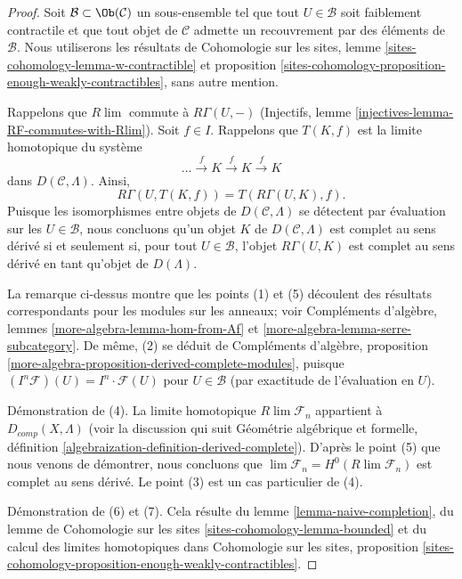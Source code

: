 \begin{proof}
Soit $\mathcal{B} \subset \Ob(\mathcal{C})$ un sous-ensemble tel que tout
$U \in \mathcal{B}$ soit faiblement contractile et que tout objet de $\mathcal{C}$
admette un recouvrement par des éléments de $\mathcal{B}$.
Nous utiliserons les résultats de Cohomologie sur les sites,
lemme \ref{sites-cohomology-lemma-w-contractible} et
proposition \ref{sites-cohomology-proposition-enough-weakly-contractibles},
sans autre mention.

\medskip\noindent
Rappelons que $R\lim$ commute à $R\Gamma(U, -)$
(Injectifs, lemme \ref{injectives-lemma-RF-commutes-with-Rlim}).
Soit $f \in I$. Rappelons que $T(K, f)$ est la limite homotopique
du système
$$
\ldots \xrightarrow{f} K \xrightarrow{f} K \xrightarrow{f} K
$$
dans $D(\mathcal{C}, \Lambda)$. Ainsi,
$$
R\Gamma(U, T(K, f)) = T(R\Gamma(U, K), f).
$$
Puisque les isomorphismes entre objets de
$D(\mathcal{C}, \Lambda)$ se détectent par évaluation sur les $U \in \mathcal{B}$,
nous concluons qu'un objet $K$ de $D(\mathcal{C}, \Lambda)$
est complet au sens dérivé si et seulement si, pour tout $U \in \mathcal{B}$,
l'objet $R\Gamma(U, K)$ est complet au sens dérivé en tant qu'objet de $D(\Lambda)$.

\medskip\noindent
La remarque ci-dessus montre que les points (1) et (5) découlent des résultats correspondants
pour les modules sur les anneaux; voir
Compléments d'algèbre, lemmes \ref{more-algebra-lemma-hom-from-Af} et
\ref{more-algebra-lemma-serre-subcategory}.
De même, (2) se déduit de
Compléments d'algèbre, proposition
\ref{more-algebra-proposition-derived-complete-modules},
puisque $(I^n\mathcal{F})(U) = I^n \cdot \mathcal{F}(U)$
pour $U \in \mathcal{B}$ (par exactitude de l'évaluation en $U$).

\medskip\noindent
Démonstration de (4). La limite homotopique $R\lim \mathcal{F}_n$ appartient à
$D_{comp}(X, \Lambda)$ (voir la discussion qui suit
Géométrie algébrique et formelle, définition
\ref{algebraization-definition-derived-complete}).
D'après le point (5) que nous venons de démontrer, nous concluons que
$\lim \mathcal{F}_n = H^0(R\lim \mathcal{F}_n)$
est complet au sens dérivé.
Le point (3) est un cas particulier de (4).

\medskip\noindent
Démonstration de (6) et (7). Cela résulte du
lemme \ref{lemma-naive-completion},
du
lemme de Cohomologie sur les sites \ref{sites-cohomology-lemma-bounded}
et du calcul des limites homotopiques dans Cohomologie sur les sites,
proposition \ref{sites-cohomology-proposition-enough-weakly-contractibles}.
\end{proof}






